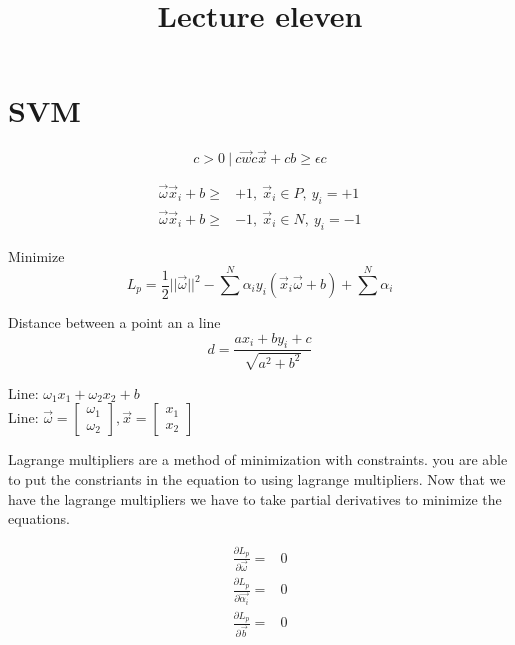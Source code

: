 \documentclass[letterpaper, 9pt]{article}
\title{Lecture eleven}
\begin{document}
\maketitle
\section{SVM}

\begin{equation}
c>0 ~|~ c\vec{w} c\vec{x} + cb \geq \epsilon c
\end{equation}

\begin{equation}
\begin{split}
\vec{\omega} \vec{x}_i + b \geq & +1,~\vec{x}_i \in P, ~ y_i = +1 \\
\vec{\omega} \vec{x}_i + b \geq & -1,~\vec{x}_i \in N, ~ y_i = -1
\end{split}
\end{equation}

Minimize
\begin{equation}
L_p = \frac{1}{2} ||\vec{\omega}||^2 - \sum^N \alpha_i y_i(\vec{x}_i \vec{\omega} + b) + \sum^N \alpha_i
\end{equation}

Distance between a point an a line
\begin{equation}
d = \frac{ax_i + by_i +c}{\sqrt{a^2 + b^2}}
\end{equation}

Line: $\omega_1 x_1 + \omega_2 x_2 + b$ \\
Line: $\vec{\omega} = \begin{bmatrix} \omega_1 \\ \omega_2 \end{bmatrix}, \vec{x} = \begin{bmatrix} x_1 \\ x_2 \end{bmatrix}$

Lagrange multipliers are a method of minimization with constraints. you are able to put the constriants in the equation to using lagrange multipliers. Now that we have the lagrange multipliers we have to take partial derivatives to minimize the equations.

\begin{equation}
\begin{split}
\frac{\partial L_p}{\partial \vec{\omega}} =& 0 \\
\frac{\partial L_p}{\partial \vec{\alpha_i}} =& 0 \\
\frac{\partial L_p}{\partial \vec{b}} =& 0
\end{split}
\end{equation}
\end{document}

